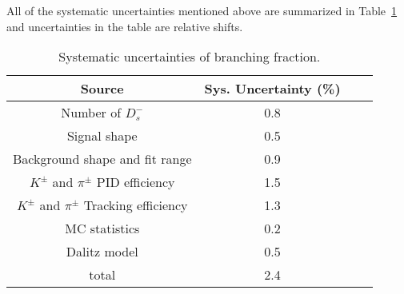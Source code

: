 \documentclass[aps,prd,twocolumn,showpacs,amsmath,amssymb]{revtex4-1}
\begin{document}
All of the systematic uncertainties mentioned above are summarized in Table~\ref{BF-Sys} and uncertainties in the table are relative shifts.
\begin{table}[htbp]
    \caption{Systematic uncertainties of branching fraction.}
    \label{BF-Sys}
    \begin{center}
        \begin{tabular}{cccc}
            \hline\hline
            Source   & Sys. Uncertainty (\%)\\
            \hline
            Number of $D_{s}^{-}$               & 0.8 \\
            Signal shape                        & 0.5 \\
            Background shape and fit range      & 0.9 \\
            $K^{\pm}$ and $\pi^{\pm}$ PID efficiency            & 1.5 \\
            $K^{\pm}$ and $\pi^{\pm}$ Tracking efficiency       & 1.3 \\
            MC statistics                       & 0.2 \\
            \hline
            Dalitz model                               & 0.5 \\
            \hline
            total                               & 2.4 \\
            \hline\hline
        \end{tabular}
    \end{center}
\end{table}



\end{document}
